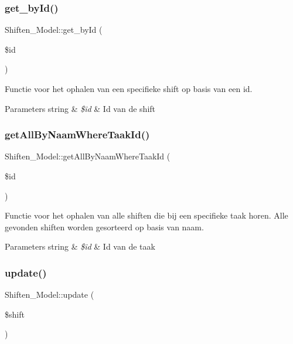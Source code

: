 \subsubsection{\texorpdfstring{get\+\_\+by\+Id()}{get\_byId()}}
{\footnotesize\ttfamily Shiften\+\_\+\+Model\+::get\+\_\+by\+Id (\begin{DoxyParamCaption}\item[{}]{\$id }\end{DoxyParamCaption})}

Functie voor het ophalen van een specifieke shift op basis van een id. 
\begin{DoxyParams}[1]{Parameters}
string & {\em \$id} & Id van de shift \\
\hline
\end{DoxyParams}
\mbox{\label{class_shiften___model_a23921f9ceba4ae6768237864469d1cf5}} 
\subsubsection{\texorpdfstring{get\+All\+By\+Naam\+Where\+Taak\+Id()}{getAllByNaamWhereTaakId()}}
{\footnotesize\ttfamily Shiften\+\_\+\+Model\+::get\+All\+By\+Naam\+Where\+Taak\+Id (\begin{DoxyParamCaption}\item[{}]{\$id }\end{DoxyParamCaption})}

Functie voor het ophalen van alle shiften die bij een specifieke taak horen. Alle gevonden shiften worden gesorteerd op basis van naam. 
\begin{DoxyParams}[1]{Parameters}
string & {\em \$id} & Id van de taak \\
\hline
\end{DoxyParams}
\mbox{\label{class_shiften___model_af5e1c7d324bab167ecaa3e827161ec13}} 
\subsubsection{\texorpdfstring{update()}{update()}}
{\footnotesize\ttfamily Shiften\+\_\+\+Model\+::update (\begin{DoxyParamCaption}\item[{}]{\$shift }\end{DoxyParamCaption})}

